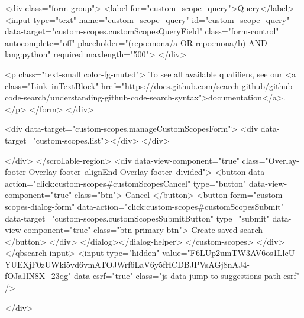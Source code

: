           <div class="form-group">
            <label for="custom_scope_query">Query</label>
            <input
              type="text"
              name="custom_scope_query"
              id="custom_scope_query"
              data-target="custom-scopes.customScopesQueryField"
              class="form-control"
              autocomplete="off"
              placeholder="(repo:mona/a OR repo:mona/b) AND lang:python"
              required
              maxlength="500">
          </div>

          <p class="text-small color-fg-muted">
            To see all available qualifiers, see our <a class="Link--inTextBlock" href="https://docs.github.com/search-github/github-code-search/understanding-github-code-search-syntax">documentation</a>.
          </p>
</form>        </div>

        <div data-target="custom-scopes.manageCustomScopesForm">
          <div data-target="custom-scopes.list"></div>
        </div>

</div>
      </scrollable-region>
      <div data-view-component="true" class="Overlay-footer Overlay-footer--alignEnd Overlay-footer--divided">          <button data-action="click:custom-scopes#customScopesCancel" type="button" data-view-component="true" class="btn">    Cancel
</button>
          <button form="custom-scopes-dialog-form" data-action="click:custom-scopes#customScopesSubmit" data-target="custom-scopes.customScopesSubmitButton" type="submit" data-view-component="true" class="btn-primary btn">    Create saved search
</button>
</div>
</dialog></dialog-helper>
    </custom-scopes>
  </div>
</qbsearch-input>  <input type="hidden" value="F6LUp2umTW3AV6os1LlcU-YUEXjF0zUWki5vd6vmATOJWrf6LaV6y5fHCDBJPVsAGj8nAJ4-fOJa1lN8X_23qg" data-csrf="true" class="js-data-jump-to-suggestions-path-csrf" />


          </div>

